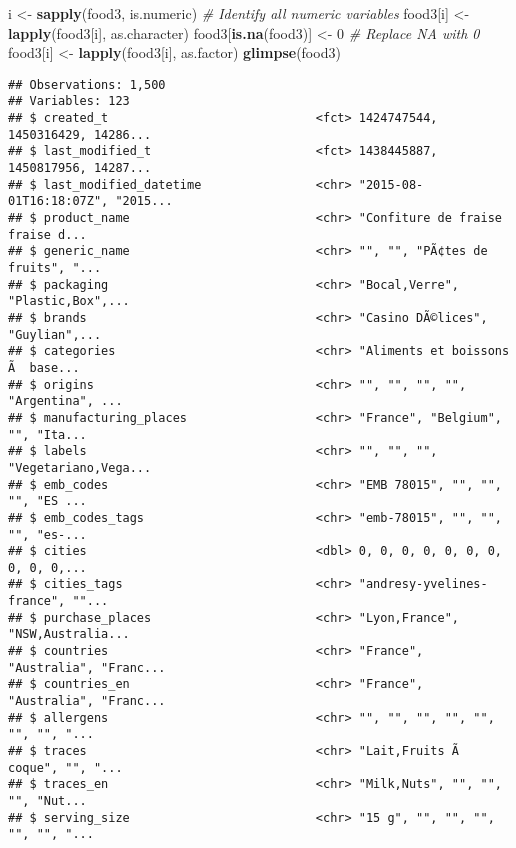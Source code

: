 \documentclass[]{article}
\newenvironment{Shaded}{\begin{snugshade}}{\end{snugshade}}
\newcommand{\CommentTok}[1]{\textcolor[rgb]{0.56,0.35,0.01}{\textit{#1}}}
\newcommand{\DecValTok}[1]{\textcolor[rgb]{0.00,0.00,0.81}{#1}}
\newcommand{\KeywordTok}[1]{\textcolor[rgb]{0.13,0.29,0.53}{\textbf{#1}}}
\newcommand{\NormalTok}[1]{#1}
\newcommand{\StringTok}[1]{\textcolor[rgb]{0.31,0.60,0.02}{#1}}
\begin{document}
\begin{Shaded}
\begin{Highlighting}[]
\NormalTok{i <-}\StringTok{ }\KeywordTok{sapply}\NormalTok{(food3, is.numeric) }\CommentTok{# Identify all numeric variables}
\NormalTok{food3[i] <-}\StringTok{ }\KeywordTok{lapply}\NormalTok{(food3[i], as.character) }
\NormalTok{food3[}\KeywordTok{is.na}\NormalTok{(food3)] <-}\StringTok{ }\DecValTok{0} \CommentTok{# Replace NA with 0}
\NormalTok{food3[i] <-}\StringTok{ }\KeywordTok{lapply}\NormalTok{(food3[i], as.factor) }
\KeywordTok{glimpse}\NormalTok{(food3)}
\end{Highlighting}
\end{Shaded}

\begin{verbatim}
## Observations: 1,500
## Variables: 123
## $ created_t                             <fct> 1424747544, 1450316429, 14286...
## $ last_modified_t                       <fct> 1438445887, 1450817956, 14287...
## $ last_modified_datetime                <chr> "2015-08-01T16:18:07Z", "2015...
## $ product_name                          <chr> "Confiture de fraise fraise d...
## $ generic_name                          <chr> "", "", "PÃ¢tes de fruits", "...
## $ packaging                             <chr> "Bocal,Verre", "Plastic,Box",...
## $ brands                                <chr> "Casino DÃ©lices", "Guylian",...
## $ categories                            <chr> "Aliments et boissons Ã  base...
## $ origins                               <chr> "", "", "", "", "Argentina", ...
## $ manufacturing_places                  <chr> "France", "Belgium", "", "Ita...
## $ labels                                <chr> "", "", "", "Vegetariano,Vega...
## $ emb_codes                             <chr> "EMB 78015", "", "", "", "ES ...
## $ emb_codes_tags                        <chr> "emb-78015", "", "", "", "es-...
## $ cities                                <dbl> 0, 0, 0, 0, 0, 0, 0, 0, 0, 0,...
## $ cities_tags                           <chr> "andresy-yvelines-france", ""...
## $ purchase_places                       <chr> "Lyon,France", "NSW,Australia...
## $ countries                             <chr> "France", "Australia", "Franc...
## $ countries_en                          <chr> "France", "Australia", "Franc...
## $ allergens                             <chr> "", "", "", "", "", "", "", "...
## $ traces                                <chr> "Lait,Fruits Ã  coque", "", "...
## $ traces_en                             <chr> "Milk,Nuts", "", "", "", "Nut...
## $ serving_size                          <chr> "15 g", "", "", "", "", "", "...

\end{verbatim}
\end{document}
